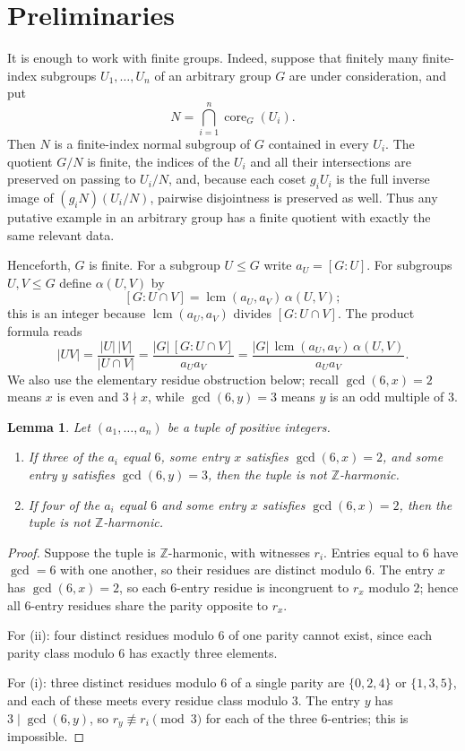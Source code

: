 \documentclass[12pt]{article}
\newtheorem{lemma}[theorem]{Lemma}
\theoremstyle{remark}
\newcommand{\lcm}{\operatorname{lcm}}
\newcommand{\Z}{\mathbb{Z}}
\begin{document}
\section{Preliminaries}\label{sec:prelim}

It is enough to work with finite groups. Indeed, suppose that finitely many
finite-index subgroups $U_1,\ldots,U_n$ of an arbitrary group $G$ are under
consideration, and put
\[
N=\bigcap_{i=1}^n \operatorname{core}_G(U_i).
\]
Then $N$ is a finite-index normal subgroup of $G$ contained in every $U_i$.
The quotient $G/N$ is finite, the indices of the $U_i$ and all their
intersections are preserved on passing to $U_i/N$, and, because each coset
$g_iU_i$ is the full inverse image of $(g_iN)(U_i/N)$, pairwise disjointness
is preserved as well. Thus any putative example in an arbitrary group has a
finite quotient with exactly the same relevant data.

Henceforth, $G$ is finite. For a subgroup $U\le G$ write $a_U=[G:U]$. For subgroups $U,V \le G$ define $\alpha(U,V)$ by
\[
[G:U \cap V] = \lcm(a_U,a_V)\,\alpha(U,V);
\]
this is an integer because $\lcm(a_U,a_V)$ divides $[G:U\cap V]$. The product formula \cite[Lemma~3.2]{MargolisSchnabel} reads
\[
|UV| = \frac{|U|\,|V|}{|U \cap V|}
      = \frac{|G|\,[G:U \cap V]}{a_U a_V}
      = \frac{|G|\,\lcm(a_U,a_V)\,\alpha(U,V)}{a_U a_V}.
\]
We also use the elementary residue obstruction below; recall $\gcd(6,x)=2$ means $x$ is even and $3\nmid x$, while $\gcd(6,y)=3$ means $y$ is an odd multiple of $3$.

\begin{lemma}\label{lem:residue}
Let $(a_1,\ldots,a_n)$ be a tuple of positive integers.
\begin{enumerate}
\item[\rm(i)] If three of the $a_i$ equal $6$, some entry $x$ satisfies $\gcd(6,x)=2$, and some entry $y$ satisfies $\gcd(6,y)=3$, then the tuple is not $\Z$-harmonic.
\item[\rm(ii)] If four of the $a_i$ equal $6$ and some entry $x$ satisfies $\gcd(6,x)=2$, then the tuple is not $\Z$-harmonic.
\end{enumerate}
\end{lemma}

\begin{proof}
Suppose the tuple is $\Z$-harmonic, with witnesses $r_i$. Entries equal to $6$ have $\gcd=6$ with one another, so their residues are distinct modulo $6$. The entry $x$ has $\gcd(6,x)=2$, so each $6$-entry residue is incongruent to $r_x$ modulo $2$; hence all $6$-entry residues share the parity opposite to $r_x$.

For (ii): four distinct residues modulo $6$ of one parity cannot exist, since each parity class modulo $6$ has exactly three elements.

For (i): three distinct residues modulo $6$ of a single parity are $\{0,2,4\}$ or $\{1,3,5\}$, and each of these meets every residue class modulo $3$. The entry $y$ has $3 \mid \gcd(6,y)$, so $r_y \not\equiv r_i \pmod 3$ for each of the three $6$-entries; this is impossible.
\end{proof}
\end{document}
